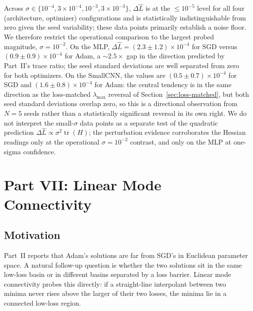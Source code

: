 Across $\sigma \in \{10^{-4}, 3\!\times\!10^{-4}, 10^{-3}, 3\!\times\!10^{-3}\}$, $\Delta\widehat L$ is at the $\le 10^{-5}$ level for all four (architecture, optimizer) configurations and is statistically indistinguishable from zero given the seed variability; these data points primarily establish a noise floor. We therefore restrict the operational comparison to the largest probed magnitude, $\sigma = 10^{-2}$. On the MLP, $\Delta\widehat L = (2.3\pm 1.2)\times 10^{-4}$ for SGD versus $(0.9\pm 0.9)\times 10^{-4}$ for Adam, a $\sim 2.5\times$ gap in the direction predicted by Part~II's trace ratio; the seed standard deviations are well separated from zero for both optimizers. On the SmallCNN, the values are $(0.5\pm 0.7)\times 10^{-4}$ for SGD and $(1.6\pm 0.8)\times 10^{-4}$ for Adam: the central tendency is in the same direction as the loss-matched $\lambda_{\max}$ reversal of Section~\ref{sec:loss-matched}, but both seed standard deviations overlap zero, so this is a directional observation from $N=5$ seeds rather than a statistically significant reversal in its own right. We do not interpret the small-$\sigma$ data points as a separate test of the quadratic prediction $\Delta\widehat L \propto \sigma^2 \operatorname{tr}(H)$; the perturbation evidence corroborates the Hessian readings only at the operational $\sigma = 10^{-2}$ contrast, and only on the MLP at one-sigma confidence.

\FloatBarrier


\section{Part VII: Linear Mode Connectivity}
\label{sec:mode-connectivity}

\subsection{Motivation}

Part~II reports that Adam's solutions are far from SGD's in Euclidean parameter space. A natural follow-up question is whether the two solutions sit in the same low-loss basin or in different basins separated by a loss barrier. Linear mode connectivity \cite{garipov2018loss,frankle2020linear} probes this directly: if a straight-line interpolant between two minima never rises above the larger of their two losses, the minima lie in a connected low-loss region.

